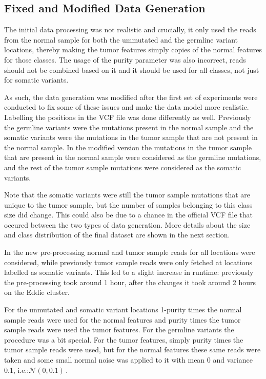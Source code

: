 \documentclass[bsc,frontabs,singlespacing,parskip,deptreport]{infthesis}
\begin{document}
\subsection{Fixed and Modified Data Generation}

The initial data processing was not realistic and crucially, it only used the reads from the normal sample for both the ummutated and the germline variant locations, thereby making the tumor features simply copies of the normal features for those classes. The usage of the purity parameter was also incorrect, reads should not be combined based on it and it should be used for all classes, not just for somatic variants. 

As such, the data generation was modified after the first set of experiments were conducted to fix some of these issues and make the data model more realistic. Labelling the positions in the VCF file was done differently as well. Previously the germline variants were the mutations present in the normal sample and the somatic variants were the mutations in the tumor sample that are not present in the normal sample. In the modified version the mutations in the tumor sample that are present in the normal sample were considered as the germline mutations, and the rest of the tumor sample mutations were considered as the somatic variants. 

Note that the somatic variants were still the tumor sample mutations that are unique to the tumor sample, but the number of samples belonging to this class size did change. This could also be due to a chance in the official VCF file that occured between the two types of data generation. More details about the size and class distribution of the final dataset are shown in the next section.

In the new pre-processing normal and tumor sample reads for all locations were considered, while previously tumor sample reads were only fetched at locations labelled as somatic variants. This led to a slight increase in runtime: previously the pre-processing took around 1 hour, after the changes it took around 2 hours on the Eddie cluster.

For the unmutated and somatic variant locations 1-purity times the normal sample reads were used for the normal features and purity times the tumor sample reads were used the tumor features. For the germline variants the procedure was a bit special. For the tumor features, simply purity times the tumor sample reads were used, but for the normal features these same reads were taken and some small normal noise was applied to  it with mean 0 and variance 0.1, i.e.:$ \mathcal{N}(0,0.1)\, $.
\end{document}
